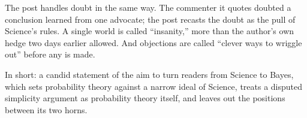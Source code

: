 \begin{afterword}
The post handles doubt in the same way. The commenter it quotes doubted a conclusion learned from one advocate; the post recasts the doubt as the pull of Science's rules. A single world is called ``insanity,'' more than the author's own hedge two days earlier allowed. And objections are called ``clever ways to wriggle out'' before any is made.

In short: a candid statement of the aim to turn readers from Science to Bayes, which sets probability theory against a narrow ideal of Science, treats a disputed simplicity argument as probability theory itself, and leaves out the positions between its two horns.
\end{afterword}
